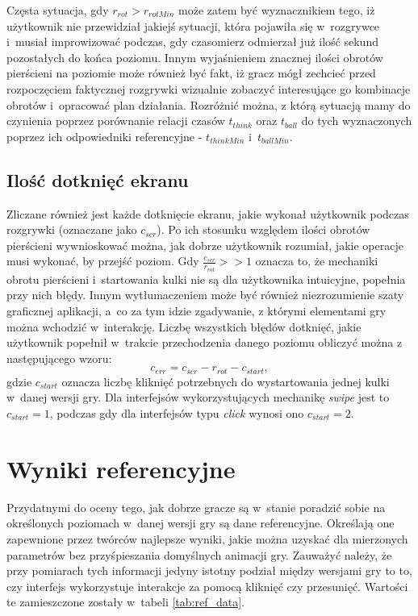 \documentclass[a4paper,12pt,numbers=noenddot]{report}
\begin{document}
Częsta sytuacja, gdy $r_{rot} > r_{rotMin}$  może zatem być wyznacznikiem tego, iż użytkownik nie przewidział jakiejś sytuacji, która pojawiła się w~rozgrywce i~musiał improwizować podczas, gdy czasomierz odmierzał już ilość sekund pozostałych do końca poziomu. Innym wyjaśnieniem znacznej ilości obrotów pierścieni na poziomie może również być fakt, iż gracz mógł zechcieć przed rozpoczęciem faktycznej rozgrywki wizualnie zobaczyć interesujące go kombinacje obrotów i~opracować plan działania. Rozróżnić można, z którą sytuacją mamy do czynienia poprzez porównanie relacji czasów $t_{think}$ oraz $t_{ball}$ do tych wyznaczonych poprzez ich odpowiedniki referencyjne - $t_{thinkMin}$ i~$t_{ballMin}$.
	\subsection{Ilość dotknięć ekranu}
Zliczane również jest każde dotknięcie ekranu, jakie wykonał użytkownik podczas rozgrywki (oznaczane jako $c_{scr}$). Po ich stosunku względem ilości obrotów pierścieni wywnioskować można, jak dobrze użytkownik rozumiał, jakie operacje musi wykonać, by przejść poziom. Gdy $\frac{c_{scr}}{r_{rot}} >> 1$ oznacza to, że mechaniki obrotu pierścieni i~startowania kulki nie są dla użytkownika intuicyjne, popełnia przy nich błędy. Innym wytłumaczeniem może być również niezrozumienie szaty graficznej aplikacji, a~co za tym idzie zgadywanie, z którymi elementami gry można wchodzić w~interakcję. Liczbę wszystkich błędów dotknięć, jakie użytkownik popełnił w~trakcie przechodzenia danego poziomu obliczyć można z następującego wzoru:
\begin{equation}
\label{eq_errors}
c_{err} = c_{scr} - r_{rot} - c_{start},
\end{equation}
gdzie  $c_{start}$ oznacza liczbę kliknięć potrzebnych do wystartowania jednej kulki w~danej wersji gry. Dla interfejsów wykorzystujących mechanikę \textit{swipe} jest to $c_{start} = 1$, podczas gdy dla interfejsów typu \textit{click} wynosi ono $c_{start} = 2$.

\section{Wyniki referencyjne}
Przydatnymi do oceny tego, jak dobrze gracze są w~stanie poradzić sobie na określonych poziomach w~danej wersji gry są dane referencyjne. Określają one zapewnione przez twórców najlepsze wyniki, jakie można uzyskać dla mierzonych parametrów bez przyśpieszania domyślnych animacji gry. Zauważyć należy, że przy pomiarach tych informacji jedyny istotny podział między wersjami gry to to, czy interfejs wykorzystuje interakcje za pomocą kliknięć czy przesunięć. Wartości te zamieszczone zostały w~tabeli \ref{tab:ref_data}.
\end{document}
